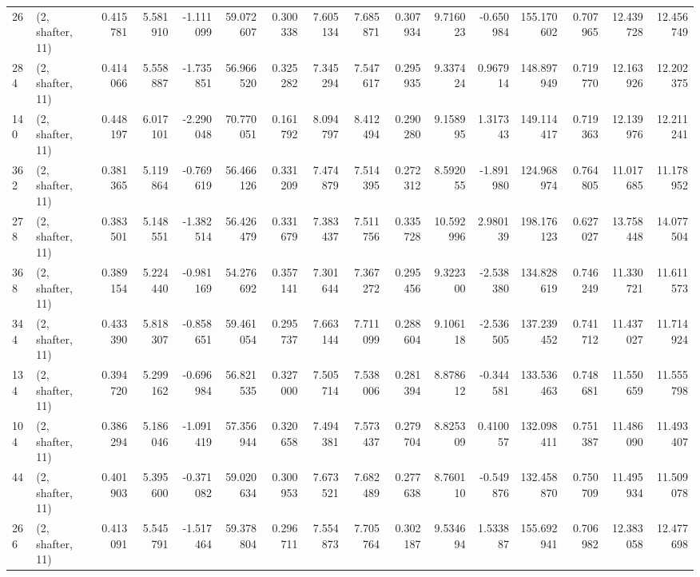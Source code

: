 \begin{tabular}{llrrrrrrrrrrrrrr}
26  &  (2, shafter, 11) &   0.415781 &   5.581910 &  -1.111099 &    59.072607 &   0.300338 &   7.605134 &   7.685871 &  0.307934 &   9.716023 &  -0.650984 &   155.170602 &  0.707965 &  12.439728 &  12.456749 \\
284 &  (2, shafter, 11) &   0.414066 &   5.558887 &  -1.735851 &    56.966520 &   0.325282 &   7.345294 &   7.547617 &  0.295935 &   9.337424 &   0.967914 &   148.897949 &  0.719770 &  12.163926 &  12.202375 \\
140 &  (2, shafter, 11) &   0.448197 &   6.017101 &  -2.290048 &    70.770051 &   0.161792 &   8.094797 &   8.412494 &  0.290280 &   9.158995 &   1.317343 &   149.114417 &  0.719363 &  12.139976 &  12.211241 \\
362 &  (2, shafter, 11) &   0.381365 &   5.119864 &  -0.769619 &    56.466126 &   0.331209 &   7.474879 &   7.514395 &  0.272312 &   8.592055 &  -1.891980 &   124.968974 &  0.764805 &  11.017685 &  11.178952 \\
278 &  (2, shafter, 11) &   0.383501 &   5.148551 &  -1.382514 &    56.426479 &   0.331679 &   7.383437 &   7.511756 &  0.335728 &  10.592996 &   2.980139 &   198.176123 &  0.627027 &  13.758448 &  14.077504 \\
368 &  (2, shafter, 11) &   0.389154 &   5.224440 &  -0.981169 &    54.276692 &   0.357141 &   7.301644 &   7.367272 &  0.295456 &   9.322300 &  -2.538380 &   134.828619 &  0.746249 &  11.330721 &  11.611573 \\
344 &  (2, shafter, 11) &   0.433390 &   5.818307 &  -0.858651 &    59.461054 &   0.295737 &   7.663144 &   7.711099 &  0.288604 &   9.106118 &  -2.536505 &   137.239452 &  0.741712 &  11.437027 &  11.714924 \\
134 &  (2, shafter, 11) &   0.394720 &   5.299162 &  -0.696984 &    56.821535 &   0.327000 &   7.505714 &   7.538006 &  0.281394 &   8.878612 &  -0.344581 &   133.536463 &  0.748681 &  11.550659 &  11.555798 \\
104 &  (2, shafter, 11) &   0.386294 &   5.186046 &  -1.091419 &    57.356944 &   0.320658 &   7.494381 &   7.573437 &  0.279704 &   8.825309 &   0.410057 &   132.098411 &  0.751387 &  11.486090 &  11.493407 \\
44  &  (2, shafter, 11) &   0.401903 &   5.395600 &  -0.371082 &    59.020634 &   0.300953 &   7.673521 &   7.682489 &  0.277638 &   8.760110 &  -0.549876 &   132.458870 &  0.750709 &  11.495934 &  11.509078 \\
266 &  (2, shafter, 11) &   0.413091 &   5.545791 &  -1.517464 &    59.378804 &   0.296711 &   7.554873 &   7.705764 &  0.302187 &   9.534694 &   1.533887 &   155.692941 &  0.706982 &  12.383058 &  12.477698 \\

\end{tabular}
